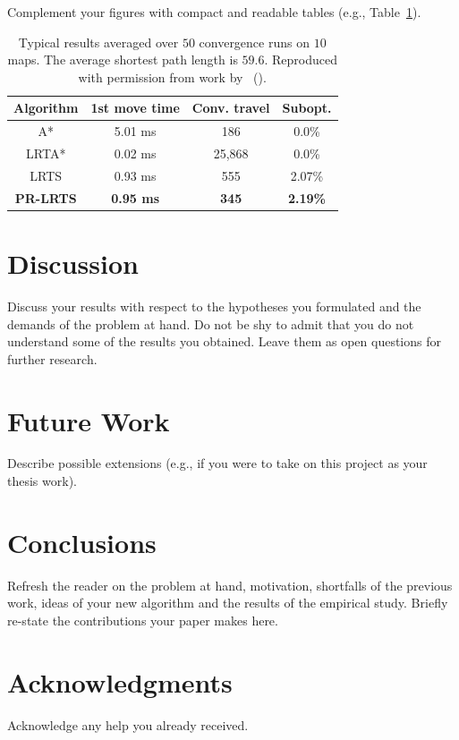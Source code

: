 \documentclass[letterpaper]{article}
\newcommand{\citea}[1]{\citeauthor{#1} (\citeyear{#1})}
\numberwithin{equation}{section}
\numberwithin{theorem}{section}
\numberwithin{lemma}{section}
\numberwithin{df}{section}
\begin{document}
Complement your figures with compact and readable tables (e.g., Table~\ref{tab:PRLRTS-cummulative}).

\begin{table}[t]
\caption{\small Typical results averaged over $50$ convergence runs on $10$ maps. The average shortest path length is $59.6$. Reproduced with permission from work by~\citea{Bulitko:05b}.}\label{tab:PRLRTS-cummulative}
\vspace{0.1cm}
{\small \begin{center}
\begin{tabular}{c|c|c|c}
\hline
Algorithm & 1st move time & Conv. travel & Subopt. \\ \hline
A* & 5.01 ms & 186 & 0.0\% \\
LRTA* & 0.02 ms & 25,868 & 0.0\% \\
LRTS & 0.93 ms & 555 & 2.07\% \\
{\bf PR-LRTS} & {\bf 0.95 ms} & {\bf 345} & {\bf 2.19\%} \\
\hline
\end{tabular}
\end{center}}
\end{table}


\section{Discussion}

Discuss your results with respect to the hypotheses you formulated and the demands of the problem at hand. Do not be shy to admit that you do not understand some of the results you obtained. Leave them as open questions for further research.

\section{Future Work}

Describe possible extensions (e.g., if you were to take on this project as your thesis work).

\section{Conclusions}

Refresh the reader on the problem at hand, motivation, shortfalls of the previous work, ideas of your new algorithm and the results of the empirical study. Briefly re-state the contributions your paper makes here.


\section*{Acknowledgments}

Acknowledge any help you already received.



\end{document}
